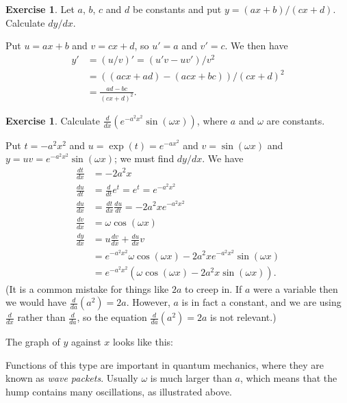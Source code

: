 \documentclass[a4paper]{book}
\newcommand{\PURPLE}[1]{{\color{purple}#1}}
\newcommand{\om}        {\omega}
\renewcommand{\:}{\colon}
\newcommand{\DEFN}[1]{\PURPLE{\emph{#1}}}
\theoremstyle{definition}
\newtheorem{exercise}[theorem]{Exercise}
\renewenvironment{solution}{\SolutionInline}{\endSolutionInline}
\begin{document}
\begin{exercise}
 Let $a$, $b$, $c$ and $d$ be constants and put $y=(ax+b)/(cx+d)$.
 Calculate $dy/dx$.
\end{exercise}
\begin{solution}
 Put $u=ax+b$ and $v=cx+d$, so $u'=a$ and $v'=c$.  We then have
 \begin{align*}
  y' &= (u/v)' = (u'v-uv')/v^2 \\
     &= ((acx + ad) - (acx+bc))/(cx+d)^2 \\
     &= \frac{ad-bc}{(cx+d)^2}.
 \end{align*}
\end{solution}

\begin{exercise}
 Calculate $\frac{d}{dx}\left(e^{-a^2x^2}\sin(\om x)\right)$, where $a$
 and $\om$ are constants.
\end{exercise}
\begin{solution}
 Put $t=-a^2x^2$ and $u=\exp(t)=e^{-ax^2}$ and $v=\sin(\om x)$ and
 $y=uv=e^{-a^2x^2}\sin(\om x)$; we must find $dy/dx$.  We have
 \begin{align*}
  \tfrac{dt}{dx} &= -2a^2x \\
  \tfrac{du}{dt} &= \tfrac{d}{dt} e^t = e^t = e^{-a^2x^2} \\
  \tfrac{du}{dx} &= \tfrac{dt}{dx} \tfrac{du}{dt} = 
                    -2a^2x e^{-a^2x^2} \\
  \tfrac{dv}{dx} &= \om\cos(\om x) \\
  \tfrac{dy}{dx} &= u \tfrac{dv}{dx} + \tfrac{du}{dx} v\\
                 &= e^{-a^2x^2} \om\cos(\om x) -
                    2a^2x e^{-a^2x^2}\sin(\om x) \\
                 &= e^{-a^2x^2}(\om\cos(\om x) - 2a^2x\sin(\om x)).
 \end{align*}
 (It is a common mistake for things like $2a$ to creep in.  If $a$
 were a variable then we would have $\frac{d}{da}(a^2)=2a$.  However,
 $a$ is in fact a constant, and we are using $\frac{d}{dx}$ rather
 than $\frac{d}{da}$, so the equation $\frac{d}{da}(a^2)=2a$ is not
 relevant.) 
\end{solution}
\begin{background}
 The graph of $y$ against $x$ looks like this:
 \begin{center}
 \end{center}
 Functions of this type are important in quantum mechanics, where they
 are known as \DEFN{wave packets}.  Usually $\om$ is much larger than
 $a$, which means that the hump contains many oscillations, as
 illustrated above.
\end{background}
\end{document}
